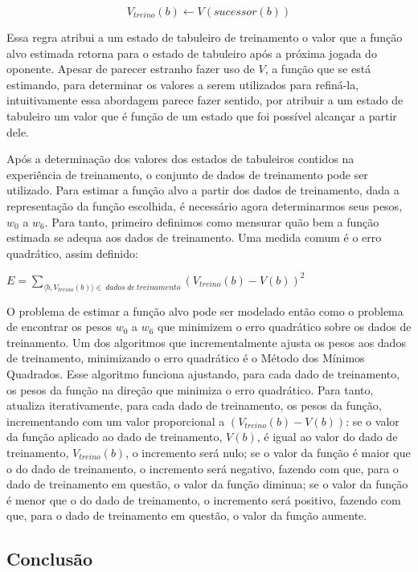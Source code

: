 \begin{equation}
V_{treino}(b) \leftarrow V(sucessor(b))
\label{eq:critico}
\end{equation}

Essa regra atribui a um estado de tabuleiro de treinamento o valor que a função alvo estimada retorna para o estado de tabuleiro após a próxima jogada do oponente. Apesar de parecer estranho fazer uso de $V$, a função que se está estimando, para determinar os valores a serem utilizados para refiná-la, intuitivamente essa abordagem parece fazer sentido, por atribuir a um estado de tabuleiro um valor que é função de um estado que foi possível alcançar a partir dele. 

Após a determinação dos valores dos estados de tabuleiros contidos na experiência de treinamento, o conjunto de dados de treinamento pode ser utilizado. Para estimar a função alvo a partir dos dados de treinamento, dada a representação da função escolhida, é necessário agora determinarmos seus pesos, $w_0$ a $w_6$. Para tanto, primeiro definimos como mensurar quão bem a função estimada se adequa aos dados de treinamento. Uma medida comum é o erro quadrático, assim definido:

$E = \sum\limits_{\langle b, V_{treino}(b) \rangle \in \ dados\ de\ treinamento} {(V_{treino}(b) - V(b))}^2$

O problema de estimar a função alvo pode ser modelado então como o problema de encontrar os pesos $w_0$ a $w_6$ que minimizem o erro quadrático sobre os dados de treinamento. Um dos algoritmos que incrementalmente ajusta os pesos aos dados de treinamento, minimizando o erro quadrático é o Método dos Mínimos Quadrados. Esse algoritmo funciona ajustando, para cada dado de treinamento, os pesos da função na direção que minimiza o erro quadrático. Para tanto, atualiza iterativamente, para cada dado de treinamento, os pesos da função, incrementando com um valor proporcional a $(V_{treino}(b) - V(b))$: se o valor da função aplicado ao dado de treinamento, $V(b)$, é igual ao valor do dado de treinamento, $V_{treino}(b)$, o incremento será nulo; se o valor da função é maior que o do dado de treinamento, o incremento será negativo, fazendo com que, para o dado de treinamento em questão, o valor da função diminua; se o valor da função é menor que o do dado de treinamento, o incremento será positivo, fazendo com que, para o dado de treinamento em questão, o valor da função aumente.

\subsection*{Conclusão}

